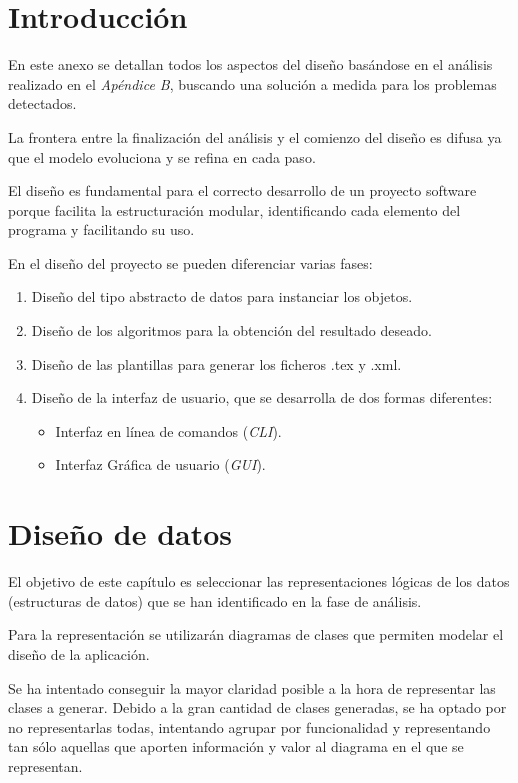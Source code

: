 
\section{Introducción}
En este anexo se detallan todos los aspectos del diseño basándose en el análisis realizado en el
\textit{Apéndice B}, buscando una solución a medida para los problemas detectados.

La frontera entre la finalización del análisis y el comienzo del diseño es difusa ya que el modelo evoluciona y se refina en cada paso.

El diseño es fundamental para el correcto desarrollo de un proyecto software porque facilita la estructuración modular, identificando cada elemento del programa y facilitando su uso.

En el diseño del proyecto se pueden diferenciar varias fases:
\begin{enumerate}
\item Diseño del tipo abstracto de datos para instanciar los objetos.
\item Diseño de los algoritmos para la obtención del resultado deseado.
\item Diseño de las plantillas para generar los ficheros .tex y .xml.
\item Diseño de la interfaz de usuario, que se desarrolla de dos formas diferentes:
\begin{itemize}
\item Interfaz en línea de comandos (\textit{CLI}).
\item Interfaz Gráfica de usuario (\textit{GUI}).
\end{itemize}
\end{enumerate}

\section{Diseño de datos}
El objetivo de este capítulo es seleccionar las representaciones lógicas de los datos (estructuras
de datos) que se han identificado en la fase de análisis.

Para la representación se utilizarán diagramas de clases que permiten modelar el diseño de la aplicación.

Se ha intentado conseguir la mayor claridad posible a la hora de representar las clases a generar. Debido a la gran cantidad de clases generadas, se ha optado por no representarlas todas, intentando agrupar por funcionalidad y representando tan sólo aquellas que aporten información y valor al diagrama en el que se representan.

